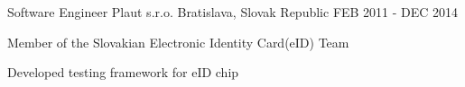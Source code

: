 \begin{cventries}
  \cventry
    {Software Engineer} %
    {Plaut s.r.o.} %
    {Bratislava, Slovak Republic} %
    {FEB 2011 - DEC 2014} %
    {
      \begin{cvitems} %
        \item {Member of the Slovakian Electronic Identity Card(eID) Team}
        \item {Developed testing framework for eID chip}
      \end{cvitems}
    }

\end{cventries}
